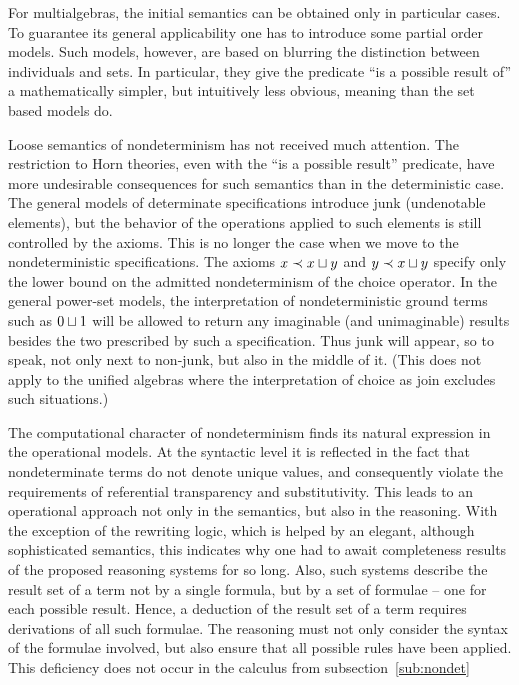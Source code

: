 {For multialgebras, the initial semantics can be obtained only in particular cases. To guarantee its 
general applicability one has to introduce some partial order models. Such models, however, are based on 
blurring the distinction between individuals and sets. In particular, they give the predicate ``is a possible 
result of'' a mathematically simpler, but intuitively less obvious, meaning than the set based models do. 

Loose semantics of nondeterminism has not received much attention. The restriction to Horn 
theories, even with the ``is a possible result'' predicate, have more undesirable consequences for such 
semantics than in the deterministic case. The general models of determinate specifications introduce junk 
(undenotable elements), but the behavior of the operations applied to such elements is still controlled by 
the axioms. This is no longer the case when we move to the nondeterministic specifications. The axioms 
$x\mathrel{\prec} x\sqcup y$ and $y\mathrel{\prec} x\sqcup y$ specify only the lower bound on the admitted nondeterminism of the choice operator. In 
the general power-set models, the interpretation of nondeterministic ground 
terms such as $0\sqcup 1$ will be 
allowed to return any imaginable (and unimaginable) results besides the two prescribed by such a 
specification. Thus junk will appear, so to speak, not only next to 
non-junk, but also in the middle of it. 
(This does not apply to the unified algebras where the interpretation of choice as join excludes such 
situations.)

The computational character of nondeterminism finds its natural expression in the operational 
models. At the syntactic level it is reflected in the fact that nondeterminate terms do not denote unique 
values, and consequently violate the requirements of referential transparency and substitutivity. This leads 
to an operational approach not only in the semantics, but also in the reasoning. With the exception of the 
rewriting logic, which is helped by an elegant, although sophisticated semantics, 
this indicates why one had 
to await completeness results of the proposed reasoning systems for so long. 
Also, such systems 
describe the result set of a term not by a single formula, but by a set 
of formulae -- one for each possible 
result. Hence, a deduction of the result set of a term requires derivations of all such formulae. The 
reasoning must not only consider the syntax of the formulae involved, but also ensure that all possible 
rules have been applied. This deficiency does not occur in the calculus 
from subsection~\ref{sub:nondet} 

}
